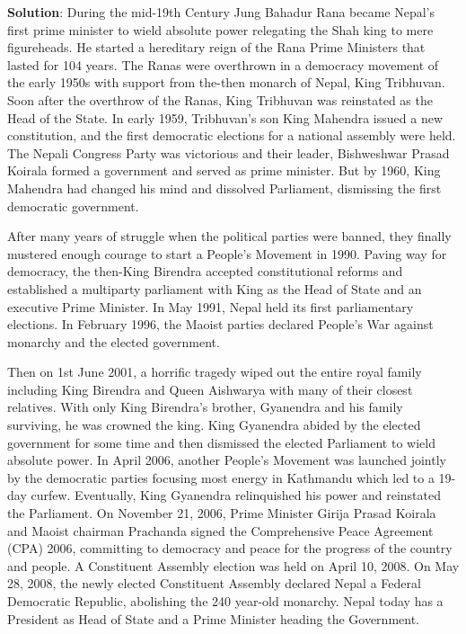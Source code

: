 \documentclass[
  openany]{book}
\newenvironment{solution}{ {\bfseries Solution}:}{}
\begin{document}
\begin{questions}
\begin{solution}
During the mid-19th Century Jung Bahadur Rana became Nepal’s first prime minister to wield absolute power relegating the Shah king to mere figureheads. He started a hereditary reign of the Rana Prime Ministers that lasted for 104 years. The Ranas were overthrown in a democracy movement of the early 1950s with support from the-then monarch of Nepal, King Tribhuvan. Soon after the overthrow of the Ranas, King Tribhuvan was reinstated as the Head of the State. In early 1959, Tribhuvan’s son King Mahendra issued a new constitution, and the first democratic elections for a national assembly were held. The Nepali Congress Party was victorious and their leader, Bishweshwar Prasad Koirala formed a government and served as prime minister. But by 1960, King Mahendra had changed his mind and dissolved Parliament, dismissing the first democratic government.

After many years of struggle when the political parties were banned, they finally mustered enough courage to start a People’s Movement in 1990. Paving way for democracy, the then-King Birendra accepted constitutional reforms and established a multiparty parliament with King as the Head of State and an executive Prime Minister. In May 1991, Nepal held its first parliamentary elections. In February 1996, the Maoist parties declared People’s War against monarchy and the elected government.

Then on 1st June 2001, a horrific tragedy wiped out the entire royal family including King Birendra and Queen Aishwarya with many of their closest relatives. With only King Birendra’s brother, Gyanendra and his family surviving, he was crowned the king. King Gyanendra abided by the elected government for some time and then dismissed the elected Parliament to wield absolute power. In April 2006, another People’s Movement was launched jointly by the democratic parties focusing most energy in Kathmandu which led to a 19-day curfew. Eventually, King Gyanendra relinquished his power and reinstated the Parliament. On November 21, 2006, Prime Minister Girija Prasad Koirala and Maoist chairman Prachanda signed the Comprehensive Peace Agreement (CPA) 2006, committing to democracy and peace for the progress of the country and people. A Constituent Assembly election was held on April 10, 2008. On May 28, 2008, the newly elected Constituent Assembly declared Nepal a Federal Democratic Republic, abolishing the 240 year-old monarchy. Nepal today has a President as Head of State and a Prime Minister heading the Government.


\end{solution}
\end{questions}
\end{document}

